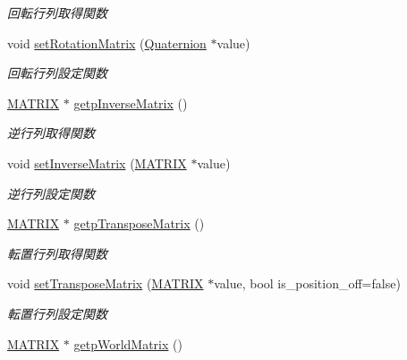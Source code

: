 \begin{DoxyCompactItemize}
\begin{DoxyCompactList}\small\item\em 回転行列取得関数 \end{DoxyCompactList}\item 
void \mbox{\hyperlink{class_matrix_group_ad1703022974a4555854c8c1f0007c510}{set\+Rotation\+Matrix}} (\mbox{\hyperlink{_vector3_d_8h_a3ee38c9c46d9851e33a9a1113328dafc}{Quaternion}} $\ast$value)
\begin{DoxyCompactList}\small\item\em 回転行列設定関数 \end{DoxyCompactList}\item 
\mbox{\hyperlink{_matrix_8h_a032295cd9fb1b711757c90667278e744}{M\+A\+T\+R\+IX}} $\ast$ \mbox{\hyperlink{class_matrix_group_a4227a527795409f939c78d58de5526f8}{getp\+Inverse\+Matrix}} ()
\begin{DoxyCompactList}\small\item\em 逆行列取得関数 \end{DoxyCompactList}\item 
void \mbox{\hyperlink{class_matrix_group_ab503242a596d4cbf5952386a588a95c1}{set\+Inverse\+Matrix}} (\mbox{\hyperlink{_matrix_8h_a032295cd9fb1b711757c90667278e744}{M\+A\+T\+R\+IX}} $\ast$value)
\begin{DoxyCompactList}\small\item\em 逆行列設定関数 \end{DoxyCompactList}\item 
\mbox{\hyperlink{_matrix_8h_a032295cd9fb1b711757c90667278e744}{M\+A\+T\+R\+IX}} $\ast$ \mbox{\hyperlink{class_matrix_group_aa800ec499808c1fb2b21e5ad2b824d7d}{getp\+Transpose\+Matrix}} ()
\begin{DoxyCompactList}\small\item\em 転置行列取得関数 \end{DoxyCompactList}\item 
void \mbox{\hyperlink{class_matrix_group_a7ece21e92a61656dd6989e172d7f86f9}{set\+Transpose\+Matrix}} (\mbox{\hyperlink{_matrix_8h_a032295cd9fb1b711757c90667278e744}{M\+A\+T\+R\+IX}} $\ast$value, bool is\+\_\+position\+\_\+off=false)
\begin{DoxyCompactList}\small\item\em 転置行列設定関数 \end{DoxyCompactList}\item 
\mbox{\hyperlink{_matrix_8h_a032295cd9fb1b711757c90667278e744}{M\+A\+T\+R\+IX}} $\ast$ \mbox{\hyperlink{class_matrix_group_adee3cb5fa992dff4f849de3899fc5ce0}{getp\+World\+Matrix}} ()

\end{DoxyCompactItemize}
